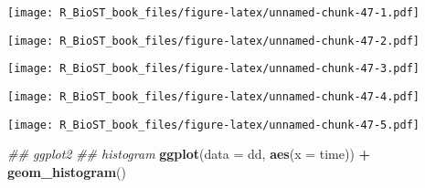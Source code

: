 \documentclass[
]{book}
\newenvironment{Shaded}{\begin{snugshade}}{\end{snugshade}}
\newcommand{\CommentTok}[1]{\textcolor[rgb]{0.56,0.35,0.01}{\textit{#1}}}
\newcommand{\DataTypeTok}[1]{\textcolor[rgb]{0.13,0.29,0.53}{#1}}
\newcommand{\DecValTok}[1]{\textcolor[rgb]{0.00,0.00,0.81}{#1}}
\newcommand{\KeywordTok}[1]{\textcolor[rgb]{0.13,0.29,0.53}{\textbf{#1}}}
\newcommand{\NormalTok}[1]{#1}
\newcommand{\OperatorTok}[1]{\textcolor[rgb]{0.81,0.36,0.00}{\textbf{#1}}}
\newcommand{\OtherTok}[1]{\textcolor[rgb]{0.56,0.35,0.01}{#1}}
\newcommand{\StringTok}[1]{\textcolor[rgb]{0.31,0.60,0.02}{#1}}
\begin{document}
\texttt{[image: R\_BioST\_book\_files/figure-latex/unnamed-chunk-47-1.pdf]}

\begin{Shaded}
\end{Shaded}

\texttt{[image: R\_BioST\_book\_files/figure-latex/unnamed-chunk-47-2.pdf]}

\begin{Shaded}
\end{Shaded}

\texttt{[image: R\_BioST\_book\_files/figure-latex/unnamed-chunk-47-3.pdf]}

\begin{Shaded}
\end{Shaded}

\texttt{[image: R\_BioST\_book\_files/figure-latex/unnamed-chunk-47-4.pdf]}

\begin{Shaded}
\end{Shaded}

\texttt{[image: R\_BioST\_book\_files/figure-latex/unnamed-chunk-47-5.pdf]}

\begin{Shaded}
\begin{Highlighting}[]
\CommentTok{\#\# ggplot2 }
\CommentTok{\#\# histogram}
\KeywordTok{ggplot}\NormalTok{(}\DataTypeTok{data =}\NormalTok{ dd, }\KeywordTok{aes}\NormalTok{(}\DataTypeTok{x =}\NormalTok{ time)) }\OperatorTok{+}\StringTok{ }
\StringTok{  }\KeywordTok{geom\_histogram}\NormalTok{()}
\end{Highlighting}
\end{Shaded}
\end{document}
